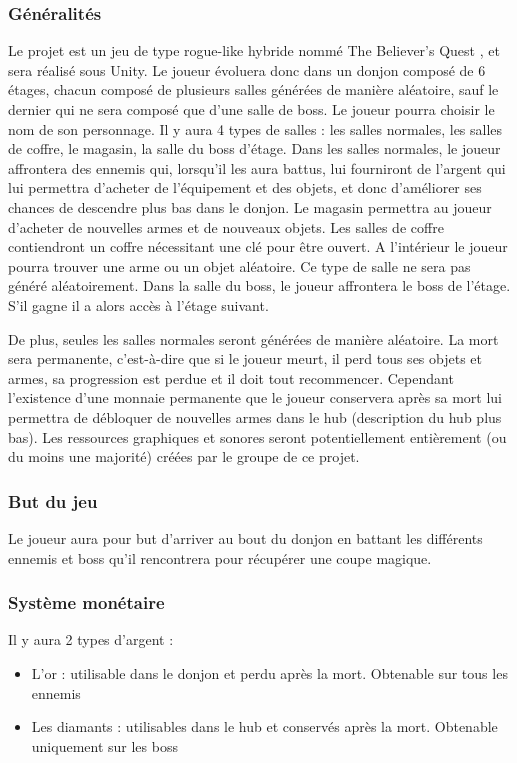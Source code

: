 \documentclass[]{extarticle}
\begin{document}
		\subsubsection{Généralités}
\bigbreak
\bigbreak
Le projet est un jeu de type rogue-like hybride nommé \og The Believer’s Quest \fg, et sera réalisé sous Unity. Le joueur évoluera donc dans un donjon composé de 6 étages, chacun composé de plusieurs salles générées de manière aléatoire, sauf le dernier qui ne sera composé que d’une salle de boss. Le joueur pourra choisir le nom de son personnage.
\bigbreak
Il y aura 4 types de salles : les salles normales, les salles de coffre, le magasin, la salle du boss d’étage. Dans les salles normales, le joueur affrontera des ennemis qui, lorsqu’il les aura battus, lui fourniront de l’argent qui lui permettra d’acheter de l’équipement et des objets, et donc d’améliorer ses chances de descendre plus bas dans le donjon. Le magasin permettra au joueur d’acheter de nouvelles armes et de nouveaux objets. Les salles de coffre contiendront un coffre nécessitant une clé pour être ouvert. A l’intérieur le joueur pourra trouver une arme ou un objet aléatoire. Ce type de salle ne sera pas généré aléatoirement. Dans la salle du boss, le joueur affrontera le boss de l’étage. S’il gagne il a alors accès à l’étage suivant.

De plus, seules les salles normales seront générées de manière aléatoire.
\bigbreak
La mort sera permanente, c’est-à-dire que si le joueur meurt, il perd tous ses objets et armes, sa progression est perdue et il doit tout recommencer. Cependant l’existence d’une monnaie permanente que le joueur conservera après sa mort lui permettra de débloquer de nouvelles armes dans le hub (description du hub plus bas).
\bigbreak
Les ressources graphiques et sonores seront potentiellement entièrement (ou du moins une majorité) créées par le groupe de ce projet. 
\bigbreak

		\subsubsection{But du jeu}
\bigbreak
\bigbreak
Le joueur aura pour but d’arriver au bout du donjon en battant les différents ennemis et boss qu’il rencontrera pour récupérer une coupe magique.
\bigbreak

		\subsubsection{Système monétaire}
\bigbreak
\bigbreak
Il y aura 2 types d’argent :
\begin{itemize}
\item L’or : utilisable dans le donjon et perdu après la mort. Obtenable sur tous les ennemis
\item Les diamants : utilisables dans le hub et conservés après la mort. Obtenable uniquement sur les boss
\end{itemize}
\bigbreak
\newpage
\end{document}
